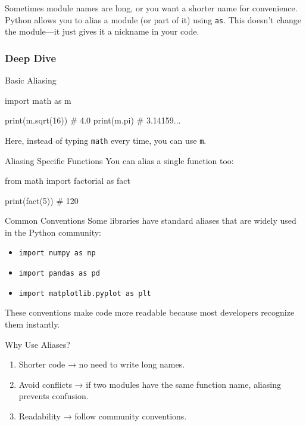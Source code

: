 \documentclass[
  letterpaper,
  DIV=11,
  numbers=noendperiod]{scrreprt}
\newenvironment{Shaded}{\begin{snugshade}}{\end{snugshade}}
\newcommand{\BuiltInTok}[1]{\textcolor[rgb]{0.00,0.23,0.31}{#1}}
\newcommand{\CommentTok}[1]{\textcolor[rgb]{0.37,0.37,0.37}{#1}}
\newcommand{\DecValTok}[1]{\textcolor[rgb]{0.68,0.00,0.00}{#1}}
\newcommand{\ImportTok}[1]{\textcolor[rgb]{0.00,0.46,0.62}{#1}}
\newcommand{\NormalTok}[1]{\textcolor[rgb]{0.00,0.23,0.31}{#1}}
\providecommand{\tightlist}{%
  \setlength{\itemsep}{0pt}\setlength{\parskip}{0pt}}
\begin{document}
Sometimes module names are long, or you want a shorter name for
convenience. Python allows you to alias a module (or part of it) using
\texttt{as}. This doesn't change the module---it just gives it a
nickname in your code.

\subsubsection{Deep Dive}\label{deep-dive-42}

Basic Aliasing

\begin{Shaded}
\begin{Highlighting}[]
\ImportTok{import}\NormalTok{ math }\ImportTok{as}\NormalTok{ m}

\BuiltInTok{print}\NormalTok{(m.sqrt(}\DecValTok{16}\NormalTok{))   }\CommentTok{\# 4.0}
\BuiltInTok{print}\NormalTok{(m.pi)         }\CommentTok{\# 3.14159...}
\end{Highlighting}
\end{Shaded}

Here, instead of typing \texttt{math} every time, you can use
\texttt{m}.

Aliasing Specific Functions You can alias a single function too:

\begin{Shaded}
\begin{Highlighting}[]
\ImportTok{from}\NormalTok{ math }\ImportTok{import}\NormalTok{ factorial }\ImportTok{as}\NormalTok{ fact}

\BuiltInTok{print}\NormalTok{(fact(}\DecValTok{5}\NormalTok{))   }\CommentTok{\# 120}
\end{Highlighting}
\end{Shaded}

Common Conventions Some libraries have standard aliases that are widely
used in the Python community:

\begin{itemize}
\tightlist
\item
  \texttt{import\ numpy\ as\ np}
\item
  \texttt{import\ pandas\ as\ pd}
\item
  \texttt{import\ matplotlib.pyplot\ as\ plt}
\end{itemize}

These conventions make code more readable because most developers
recognize them instantly.

Why Use Aliases?

\begin{enumerate}
\def\labelenumi{\arabic{enumi}.}
\tightlist
\item
  Shorter code → no need to write long names.
\item
  Avoid conflicts → if two modules have the same function name, aliasing
  prevents confusion.
\item
  Readability → follow community conventions.
\end{enumerate}
\end{document}
